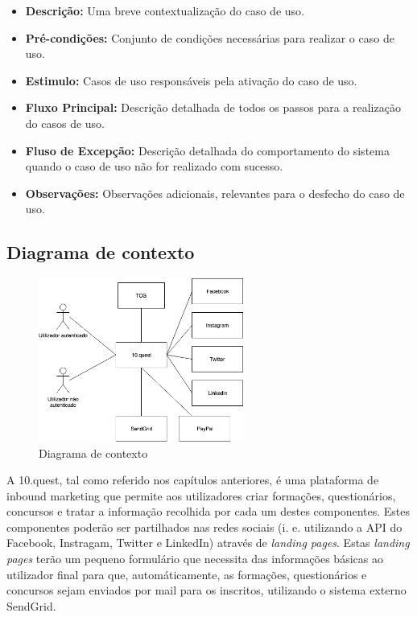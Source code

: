 \begin{itemize}
	\item \textbf{Descrição:} Uma breve contextualização do caso de uso.
	\item \textbf{Pré-condições:} Conjunto de condições necessárias para realizar o caso de uso.
	\item \textbf{Estimulo:} Casos de uso responsáveis pela ativação do caso de uso.
	\item \textbf{Fluxo Principal:} Descrição detalhada de todos os passos para a realização do casos de uso.
	\item \textbf{Fluso de Excepção:} Descrição detalhada do comportamento do sistema quando o caso de uso não for realizado com sucesso.
	\item \textbf{Observações:} Observações adicionais, relevantes para o desfecho do caso de uso.
\end{itemize}

\newpage

\subsection{Diagrama de contexto}
\label{d:contexto}
\begin{figure}[ht!]
	\begin{center}
		\includegraphics[width=0.6\textwidth]{img/rf/10quest}
		\caption{Diagrama de contexto}
		\label{fig:rf-10quest}
	\end{center}
\end{figure}

A 10.quest, tal como referido nos capítulos anteriores, é uma plataforma de inbound marketing que permite aos utilizadores criar formações, questionários, concursos e tratar a informação recolhida por cada um destes componentes. 
Estes componentes poderão ser partilhados nas redes sociais (i. e. utilizando a API do Facebook, Instragam, Twitter e LinkedIn) através de \textit{landing pages}. Estas \textit{landing pages} terão um pequeno formulário que necessita das informações básicas ao utilizador final para que, automáticamente, as formações, questionários e concursos sejam enviados por mail para os inscritos, utilizando o sistema externo SendGrid.

